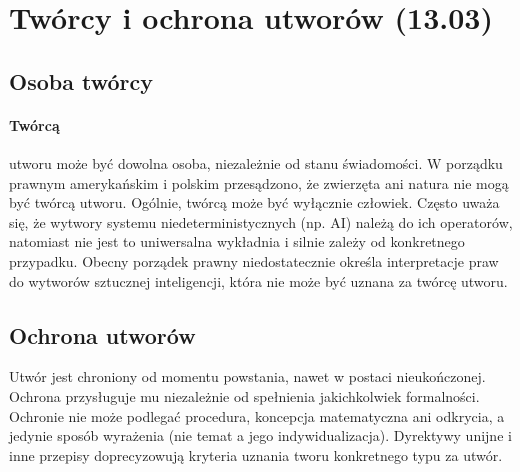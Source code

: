 \documentclass{article}
\begin{document}
\section{Twórcy i ochrona utworów (13.03)}

\subsection{Osoba twórcy}

\paragraph{Twórcą}
utworu może być dowolna osoba, niezależnie od stanu świadomości.
W porządku prawnym amerykańskim i polskim przesądzono, że zwierzęta ani natura nie mogą być twórcą utworu.
Ogólnie, twórcą może być wyłącznie człowiek.
Często uważa się, że wytwory systemu niedeterministycznych (np. AI) należą do ich operatorów,
natomiast nie jest to uniwersalna wykładnia i silnie zależy od konkretnego przypadku.
Obecny porządek prawny niedostatecznie określa interpretacje praw do wytworów sztucznej inteligencji,
która nie może być uznana za twórcę utworu.

\subsection{Ochrona utworów}

Utwór jest chroniony od momentu powstania, nawet w postaci nieukończonej.
Ochrona przysługuje mu niezależnie od spełnienia jakichkolwiek formalności.
Ochronie nie może podlegać procedura, koncepcja matematyczna ani odkrycia,
a jedynie sposób wyrażenia (nie temat a jego indywidualizacja).
Dyrektywy unijne i inne przepisy doprecyzowują kryteria uznania tworu konkretnego typu za utwór.
\end{document}
